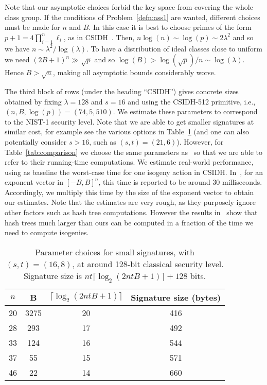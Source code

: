 \documentclass{llncs}
\begin{document}
Note that our asymptotic choices forbid the key space from covering the whole class group.
If the conditions of Problem~\ref{defn:ass1} are wanted, different choices must be made for $n$ and $B$.
In this case it is best to choose primes of the form $p+1 = 4\prod_{i=1}^n\ell_i$, as in CSIDH~\cite{CLMPR18}.
Then, $n\log(n)\sim\log(p)\sim 2\lambda^2$ and so we have  $n \sim \lambda^2 / \log(\lambda)$.
To have a distribution of ideal classes close to uniform we need $(2B+1)^n \gg \sqrt{p}$ and so $\log(B) > \log( \sqrt{p} )/n \sim \log(\lambda)$.
Hence $B > \sqrt{n}$, making all asymptotic bounds considerably worse.

The third block of rows (under the heading ``CSIDH'') gives concrete sizes obtained by fixing $\lambda=128$ and $s=16$ and using the CSIDH-512 primitive, i.e., $(n,B,\log(p)) = (74,5,510)$.
We estimate these parameters to correspond to the NIST-1 security level.
Note that we are able to get smaller signatures at similar cost, for example see the various options in Table~\ref{tab:alt-params} (and one can also potentially consider $s > 16$, such as $(s,t)=(21,6)$).
However, for Table~\ref{tab:comparison} we choose the same parameters as~\cite{CLMPR18} so that we are able to refer to their running-time computations.
We estimate real-world performance, using as baseline the worst-case time for one isogeny action in CSIDH.
In~\cite{CLMPR18,cryptoeprint:2018:782}, for an exponent vector in $[-B,B]^n$, this time is reported to be around $30$ milliseconds.
Accordingly, we multiply this time by the size of the exponent vector to obtain our estimates.
Note that the estimates are very rough, as they purposely ignore other factors such as hash tree computations.
However the results in~\cite{10.1007/978-3-662-49384-7_15,sphincs+} show that hash trees much larger than ours can be computed in a fraction of the time we need to compute isogenies.




\begin{table}
\begin{center}
\begin{tabular}{|c|c|c|c|} \hline
  $n$ & B & $\lceil \log_2( 2ntB + 1) \rceil$ & Signature size (bytes) \\
\hline
  20 & 3275 & 20 & 416 \\
  28 & 293 & 17 & 492 \\
  33 & 124 & 16 & 544 \\
  37 & 55 & 15 & 571 \\
  46 & 22 & 14 & 660 \\
\hline
\end{tabular}
\end{center}
\caption{Parameter choices for small signatures, with $(s,t)=(16,8)$, at around 128-bit classical security level. Signature size is $nt \lceil \log_2( 2ntB + 1) \rceil + 128$ bits. \label{tab:alt-params}}
\end{table}
\end{document}

